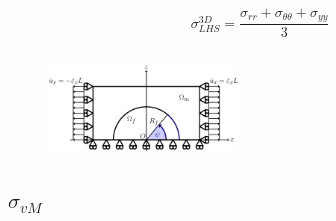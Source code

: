 \documentclass[first,firstsupp,lastsupp,last,hyperref,table]{ETHclass}
\begin{document}
\begin{frame}
\begin{columns}[c]
\begin{column}{0.5\textwidth}
\begin{figure}
\end{figure}
\vspace{-0.5cm}
\scriptsize
\begin{equation*}
\sigma^{3D}_{LHS}=\frac{\sigma_{rr}+\sigma_{\theta\theta}+\sigma_{yy}}{3}
\end{equation*}
\end{column}
\end{columns}
\vspace{-0.3cm}
\centering
\begin{figure}
\centering
\includegraphics[width=0.45\textwidth]{refAngle.pdf}
\end{figure}
\end{frame}

\subsection{$\sigma_{vM}$}
\end{document}
